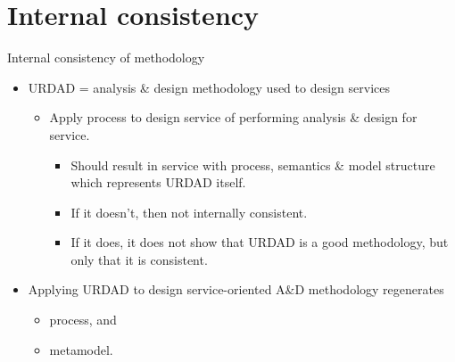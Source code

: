 \section{Internal consistency}

\begin{frame}{Internal consistency of methodology}

  \begin{itemize}
    \item<+-| alert@+> URDAD = analysis \& design methodology used to design services
      \begin{itemize}
		  \item Apply process to design service of performing analysis \& design for service.
			 \begin{itemize}
				\item Should result in service with process, semantics \& model structure which represents URDAD itself.
				\item If it doesn't, then not internally consistent.
            \item If it does, it does not show that URDAD is a good methodology, but only that it is consistent.
		    \end{itemize}
      \end{itemize}

	 \item<+-| alert@+> Applying URDAD to design service-oriented A\&D methodology regenerates
		\begin{itemize}
		  \item process, and
		  \item metamodel.
		\end{itemize}
  \end{itemize}
\end{frame}
